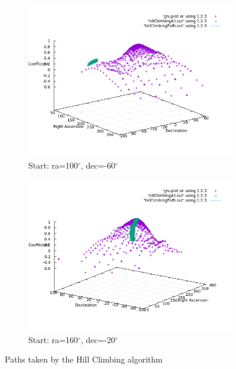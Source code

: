 \begin{figure}[!htb]
	\begin{subfigure}[b]{0.5\textwidth}
		\includegraphics[width=\linewidth]{images/ch6/hillClimbing/resultsPathBad.png}
		\caption{Start: ra=100$^{\circ}$, dec=-60$^{\circ}$}
	\end{subfigure}
	\hfill
	\begin{subfigure}[b]{0.5\textwidth}
		\includegraphics[width=\linewidth]{images/ch6/hillClimbing/resultsPathGood.png}
		\caption{Start: ra=160$^{\circ}$, dec=-20$^{\circ}$}
	\end{subfigure}
	\caption{Paths taken by the Hill Climbing algorithm}
	\label{fig:hillClimbingPaths}
\end{figure}

